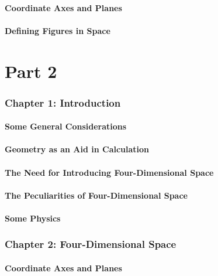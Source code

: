 \documentclass[10pt]{article}
\begin{document}
\subsection{Coordinate Axes and Planes}

\subsection{Defining Figures in Space}



\part{Part 2}

\section{Chapter 1: Introduction}

\subsection{Some General Considerations}

\subsection{Geometry as an Aid in Calculation}

\subsection{The Need for Introducing Four-Dimensional Space}

\subsection{The Peculiarities of Four-Dimensional Space}

\subsection{Some Physics}


\section{Chapter 2: Four-Dimensional Space}

\subsection{Coordinate Axes and Planes}
\end{document}
